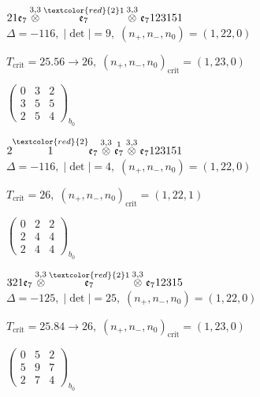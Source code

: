 \documentclass[10pt]{article}
\begin{document}
\smallskip

$21\mathfrak{e}_7\overset{3,3}{\otimes}\overset{\textcolor{red}{2}1}{\mathfrak{e}_7}\overset{3,3}{\otimes}\mathfrak{e}_7123151$ \quad $\Delta=-116,\; |\det|=9,\; (n_+,n_-,n_0)=(1,22,0)$

\hspace{1em}$T_{\text{crit}}=25.56 \to 26,\; (n_+,n_-,n_0)_{\text{crit}}=(1,23,0)$

\hspace{2em}$\left(\begin{smallmatrix}0 & 3 & 2 \\ 3 & 5 & 5 \\ 2 & 5 & 4\end{smallmatrix}\right)_{\!b_0}$

$2\overset{\textcolor{red}{2}}{1}\mathfrak{e}_7\overset{3,3}{\otimes}\overset{1}{\mathfrak{e}_7}\overset{3,3}{\otimes}\mathfrak{e}_7123151$ \quad $\Delta=-116,\; |\det|=4,\; (n_+,n_-,n_0)=(1,22,0)$

\hspace{1em}$T_{\text{crit}}=26,\; (n_+,n_-,n_0)_{\text{crit}}=(1,22,1)$

\hspace{2em}$\left(\begin{smallmatrix}0 & 2 & 2 \\ 2 & 4 & 4 \\ 2 & 4 & 4\end{smallmatrix}\right)_{\!b_0}$

\smallskip

$321\mathfrak{e}_7\overset{3,3}{\otimes}\overset{\textcolor{red}{2}1}{\mathfrak{e}_7}\overset{3,3}{\otimes}\mathfrak{e}_712315$ \quad $\Delta=-125,\; |\det|=25,\; (n_+,n_-,n_0)=(1,22,0)$

\hspace{1em}$T_{\text{crit}}=25.84 \to 26,\; (n_+,n_-,n_0)_{\text{crit}}=(1,23,0)$

\hspace{2em}$\left(\begin{smallmatrix}0 & 5 & 2 \\ 5 & 9 & 7 \\ 2 & 7 & 4\end{smallmatrix}\right)_{\!b_0}$
\end{document}
